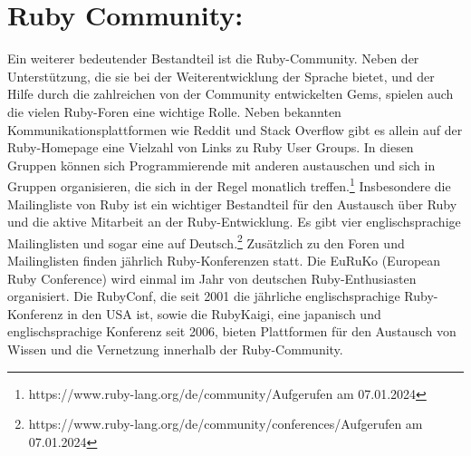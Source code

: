 \documentclass{article}
\begin{document}
\section*{Ruby Community:}
Ein weiterer bedeutender Bestandteil ist die Ruby-Community. Neben der Unterstützung, die sie bei der Weiterentwicklung der Sprache bietet, und der Hilfe durch die zahlreichen von der Community entwickelten Gems, spielen auch die vielen Ruby-Foren eine wichtige Rolle.
Neben bekannten Kommunikationsplattformen wie Reddit und Stack Overflow gibt es allein auf der Ruby-Homepage eine Vielzahl von Links zu Ruby User Groups. In diesen Gruppen können sich Programmierende mit anderen austauschen und sich in Gruppen organisieren, die sich in der Regel monatlich treffen.\footnote{https://www.ruby-lang.org/de/community/Aufgerufen am 07.01.2024}
Insbesondere die Mailingliste von Ruby ist ein wichtiger Bestandteil für den Austausch über Ruby und die aktive Mitarbeit an der Ruby-Entwicklung. Es gibt vier englischsprachige Mailinglisten und sogar eine auf Deutsch.\footnote{https://www.ruby-lang.org/de/community/conferences/Aufgerufen am 07.01.2024}
Zusätzlich zu den Foren und Mailinglisten finden jährlich Ruby-Konferenzen statt. Die EuRuKo (European Ruby Conference) wird einmal im Jahr von deutschen Ruby-Enthusiasten organisiert. Die RubyConf, die seit 2001 die jährliche englischsprachige Ruby-Konferenz in den USA ist, sowie die RubyKaigi, eine japanisch und englischsprachige Konferenz seit 2006, bieten Plattformen für den Austausch von Wissen und die Vernetzung innerhalb der Ruby-Community.
\end{document}
